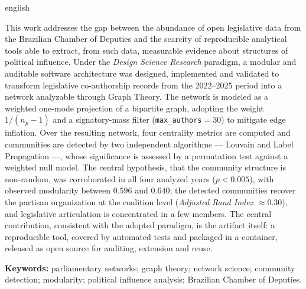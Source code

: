 \documentclass[
      12pt,
      a4paper,
      openright,
      oneside,
      chapter=TITLE,
      section=TITLE,
      english,
      french,
      spanish,
      brazilian
    ]{abntex2}
\begin{document}
    \begin{resumo}[Abstract]
    \begin{otherlanguage*}{english}

    This work addresses the gap between the abundance of open legislative data from the Brazilian Chamber of Deputies and the scarcity of reproducible analytical tools able to extract, from such data, measurable evidence about structures of political influence. Under the \textit{Design Science Research} paradigm, a modular and auditable software architecture was designed, implemented and validated to transform legislative co-authorship records from the 2022--2025 period into a network analyzable through Graph Theory. The network is modeled as a weighted one-mode projection of a bipartite graph, adopting the weight $1/(n_p-1)$ and a signatory-mass filter (\texttt{max\_authors}$=30$) to mitigate edge inflation. Over the resulting network, four centrality metrics are computed and communities are detected by two independent algorithms --- Louvain and Label Propagation ---, whose significance is assessed by a permutation test against a weighted null model. The central hypothesis, that the community structure is non-random, was corroborated in all four analyzed years ($p<0.005$), with observed modularity between $0.596$ and $0.640$; the detected communities recover the partisan organization at the coalition level (\textit{Adjusted Rand Index} $\approx 0.30$), and legislative articulation is concentrated in a few members. The central contribution, consistent with the adopted paradigm, is the artifact itself: a reproducible tool, covered by automated tests and packaged in a container, released as open source for auditing, extension and reuse.

        \vspace*{0.5cm}
        \noindent\textbf{{Keywords: }} parliamentary networks; graph theory; network science; community detection; modularity; political influence analysis; Brazilian Chamber of Deputies.
    \end{otherlanguage*}
    \end{resumo}
    
        \listoffigures*
        \newpage
    
\end{document}
